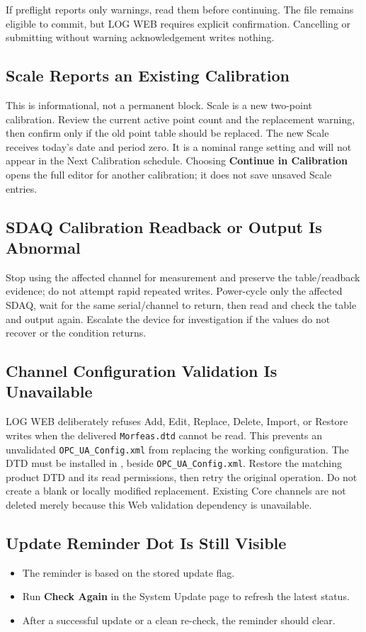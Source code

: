 \documentclass[11pt,a4paper]{article}
\begin{document}
If preflight reports only warnings, read them before continuing. The file remains eligible to commit, but LOG WEB requires explicit confirmation. Cancelling or submitting without warning acknowledgement writes nothing.

\subsection{Scale Reports an Existing Calibration}
This is informational, not a permanent block. Scale is a new two-point calibration. Review the current active point count and the replacement warning, then confirm only if the old point table should be replaced. The new Scale receives today's date and period zero. It is a nominal range setting and will not appear in the Next Calibration schedule. Choosing \textbf{Continue in Calibration} opens the full editor for another calibration; it does not save unsaved Scale entries.

\subsection{SDAQ Calibration Readback or Output Is Abnormal}
Stop using the affected channel for measurement and preserve the table/readback evidence; do not attempt rapid repeated writes. Power-cycle only the affected SDAQ, wait for the same serial/channel to return, then read and check the table and output again. Escalate the device for investigation if the values do not recover or the condition returns.

\subsection{Channel Configuration Validation Is Unavailable}
LOG WEB deliberately refuses Add, Edit, Replace, Delete, Import, or Restore writes when the delivered \texttt{Morfeas.dtd} cannot be read. This prevents an unvalidated \texttt{OPC\_UA\_Config.xml} from replacing the working configuration. The DTD must be installed in , beside \texttt{OPC\_UA\_Config.xml}. Restore the matching product DTD and its read permissions, then retry the original operation. Do not create a blank or locally modified replacement. Existing Core channels are not deleted merely because this Web validation dependency is unavailable.

\subsection{Update Reminder Dot Is Still Visible}
\begin{itemize}
\item The reminder is based on the stored update flag.
\item Run \textbf{Check Again} in the System Update page to refresh the latest status.
\item After a successful update or a clean re-check, the reminder should clear.
\end{itemize}
\end{document}
